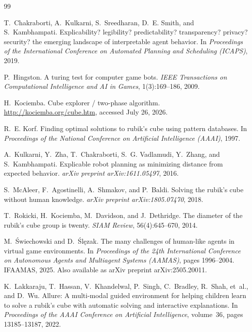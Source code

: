 \documentclass[10pt,conference]{article}
\begin{document}

\begin{thebibliography}{99}

T.~Chakraborti, A.~Kulkarni, S.~Sreedharan, D.~E. Smith, and
S.~Kambhampati.
\newblock Explicability? legibility? predictability? transparency?
  privacy? security? the emerging landscape of interpretable agent
  behavior.
\newblock In \emph{Proceedings of the International Conference on
  Automated Planning and Scheduling (ICAPS)}, 2019.

P.~Hingston.
\newblock A turing test for computer game bots.
\newblock \emph{IEEE Transactions on Computational Intelligence and AI
  in Games}, 1(3):169--186, 2009.

H.~Kociemba.
\newblock Cube explorer / two-phase algorithm.
\newblock \url{http://kociemba.org/cube.htm}, accessed July 26, 2026.

R.~E. Korf.
\newblock Finding optimal solutions to rubik's cube using pattern
  databases.
\newblock In \emph{Proceedings of the National Conference on
  Artificial Intelligence (AAAI)}, 1997.

A.~Kulkarni, Y.~Zha, T.~Chakraborti, S.~G. Vadlamudi, Y.~Zhang, and
S.~Kambhampati.
\newblock Explicable robot planning as minimizing distance from
  expected behavior.
\newblock \emph{arXiv preprint arXiv:1611.05497}, 2016.

S.~McAleer, F.~Agostinelli, A.~Shmakov, and P.~Baldi.
\newblock Solving the rubik's cube without human knowledge.
\newblock \emph{arXiv preprint arXiv:1805.07470}, 2018.

T.~Rokicki, H.~Kociemba, M.~Davidson, and J.~Dethridge.
\newblock The diameter of the rubik's cube group is twenty.
\newblock \emph{SIAM Review}, 56(4):645--670, 2014.

M.~{\'S}wiechowski and D.~{\'S}l{\k{e}}zak.
\newblock The many challenges of human-like agents in virtual game
  environments.
\newblock In \emph{Proceedings of the 24th International Conference on
  Autonomous Agents and Multiagent Systems (AAMAS)}, pages 1996--2004.
  IFAAMAS, 2025.
\newblock Also available as arXiv preprint arXiv:2505.20011.

K.~Lakkaraju, T.~Hassan, V.~Khandelwal, P.~Singh, C.~Bradley, R.~Shah, et~al.,
  and D.~Wu.
\newblock Allure: A multi-modal guided environment for helping children
  learn to solve a rubik's cube with automatic solving and interactive
  explanations.
\newblock In \emph{Proceedings of the AAAI Conference on Artificial
  Intelligence}, volume~36, pages 13185--13187, 2022.


\end{thebibliography}
\end{document}
